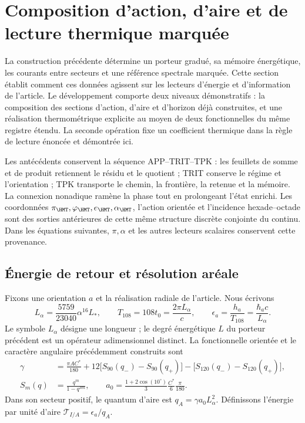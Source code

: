 \section{Composition d’action, d’aire et de lecture thermique marquée}
\label{sec:ii-termica-marcada}

La construction précédente détermine un porteur gradué, sa mémoire
énergétique, les courants entre secteurs et une référence spectrale marquée.
Cette section établit comment ces données agissent sur les lecteurs d’énergie
et d’information de l’article. Le développement comporte deux niveaux démonstratifs :
la composition des sections d’action, d’aire et d’horizon déjà construites,
et une réalisation thermométrique explicite au moyen de deux fonctionnelles du même
registre étendu. La seconde opération fixe un coefficient thermique dans
la règle de lecture énoncée et démontrée ici.

Les antécédents conservent la séquence APP--TRIT--TPK : les feuillets de somme
et de produit retiennent le résidu et le quotient ; TRIT conserve le régime et l’orientation ;
TPK transporte le chemin, la frontière, la retenue et la mémoire. La connexion nonadique ramène
la phase tout en prolongeant l’état enrichi. Les coordonnées
$\pi_{\HMT},\varphi_{\HMT},e_{\HMT},\alpha_{\HMT}$, l’action
orientée et l’incidence hexade--octade sont des sorties antérieures de cette même
structure discrète conjointe du continu. Dans les équations suivantes,
$\pi,\alpha$ et les autres lecteurs scalaires conservent cette provenance.

\subsection{Énergie de retour et résolution aréale}
\label{subsec:ii-termica-accion-area}

Fixons une orientation $a$ et la réalisation radiale de l’article. Nous écrivons
\begin{equation}
 L_\alpha=\frac{5759}{23040}\alpha^{16}L_* ,\qquad
 T_{108}=108t_0=\frac{2\pi L_\alpha}{c},\qquad
 \epsilon_a=\frac{h_a}{T_{108}}=\frac{\hbar_a c}{L_\alpha}.
 \label{eq:ii-ter27-energia}
\end{equation}
Le symbole $L_\alpha$ désigne une longueur ; le degré énergétique $L$ du
porteur précédent est un opérateur adimensionnel distinct. La fonctionnelle
orientée et le caractère angulaire précédemment construits sont
\begin{align}
 \gamma&=\frac{\pi AC^*}{180}
 +12\bigl[S_{90}(q_-)-S_{90}(q_+)\bigr]
 -\bigl[S_{120}(q_-)-S_{120}(q_+)\bigr],\nonumber\\
 S_m(q)&=\frac{q^m}{1-q^{3m}},\qquad
 a_0=\frac{1+2\cos(10^\circ)}3\frac{C^*}{6}\frac{\pi}{180}.
 \label{eq:ii-ter27-barbero}
\end{align}
Dans son secteur positif, le quantum d’aire est
$q_A=\gamma a_0L_\alpha^2$. Définissons l’énergie par unité d’aire
$\mathcal T_{I/A}=\epsilon_a/q_A$.

